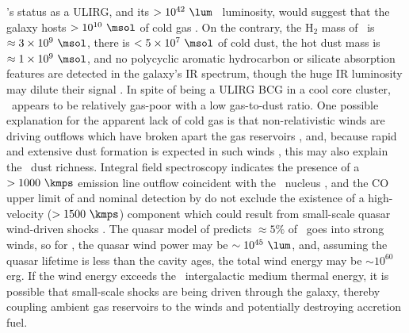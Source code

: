 \documentclass[useAMS,usenatbib]{mn2e}
\begin{document}
\irs's status as a ULIRG, and its $> 10^{42} ~\lum$
\halpha\ luminosity, would suggest that the galaxy hosts $> 10^{10}
~\msol$ of cold gas \citep[\eg][]{1988ApJ...325...74S, edge01}. On the
contrary, the H$_2$ mass of \irs\ is $\approx 3 \times 10^{9} ~\msol$,
there is $< 5 \times 10^7 ~\msol$ of cold dust, the hot dust mass is
$\approx 1 \times 10^9 ~\msol$, and no polycyclic aromatic hydrocarbon
or silicate absorption features are detected in the galaxy's IR
spectrum, though the huge IR luminosity may dilute their signal
\citep{1997A&A...318L...1T, 2004ApJ...613..986P, 2008ApJ...683..114S,
  2010arXiv1009.2040C}. In spite of being a ULIRG BCG in a cool core
cluster, \irs\ appears to be relatively gas-poor with a low
gas-to-dust ratio. One possible explanation for the apparent lack of
cold gas is that non-relativistic winds are driving outflows which
have broken apart the gas reservoirs
\citep[\eg][]{2010MNRAS.401....7H}, and, because rapid and extensive
dust formation is expected in such winds \citep{2002ApJ...567L.107E},
this may also explain the \irs\ dust richness. Integral field
spectroscopy indicates the presence of a $> 1000 ~\kmps$ emission line
outflow coincident with the \irs\ nucleus \citep{1996MNRAS.283.1003C},
and the CO upper limit of \citet{1998ApJ...506..205E} and nominal
detection by \citet{2010arXiv1009.2040C} do not exclude the existence
of a high-velocity ($> 1500 ~\kmps$) component which could result from
small-scale quasar wind-driven shocks
\citep[\eg][]{2010A&A...518L.155F}. The quasar model of
\citet{2005ApJ...619...60L} predicts $\approx 5\%$ of \lqso\ goes into
strong winds, so for \irs, the quasar wind power may be $\sim 10^{45}
~\lum$, and, assuming the quasar lifetime is less than the cavity
ages, the total wind energy may be $\sim 10^{60}$ erg. If the wind
energy exceeds the \irs\ intergalactic medium thermal energy, it is
possible that small-scale shocks are being driven through the galaxy,
thereby coupling ambient gas reservoirs to the winds and potentially
destroying accretion fuel.
\end{document}

